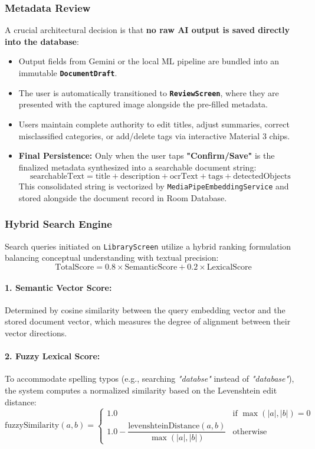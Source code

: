 \subsubsection{Metadata Review}
A crucial architectural decision is that \textbf{no raw AI output is saved directly into the database}:
\begin{itemize}
    \item Output fields from Gemini or the local ML pipeline are bundled into an immutable \textbf{\texttt{DocumentDraft}}.
    \item The user is automatically transitioned to \textbf{\texttt{ReviewScreen}}, where they are presented with the captured image alongside the pre-filled metadata.
    \item Users maintain complete authority to edit titles, adjust summaries, correct misclassified categories, or add/delete tags via interactive Material 3 chips.
    \item \textbf{Final Persistence:} Only when the user taps \textbf{"Confirm/Save"} is the finalized metadata synthesized into a searchable document string:
    $$\text{searchableText} = \text{title} + \text{description} + \text{ocrText} + \text{tags} + \text{detectedObjects}$$
    This consolidated string is vectorized by \texttt{MediaPipeEmbeddingService} and stored alongside the document record in Room Database.
\end{itemize}

\subsubsection{Hybrid Search Engine}
Search queries initiated on \texttt{LibraryScreen} utilize a hybrid ranking formulation balancing conceptual understanding with textual precision:
\begin{equation}
\text{TotalScore} = 0.8 \times \text{SemanticScore} + 0.2 \times \text{LexicalScore}
\end{equation}

\paragraph{1. Semantic Vector Score:}
Determined by cosine similarity between the query embedding vector and the stored document vector, which measures the degree of alignment between their vector directions.

\paragraph{2. Fuzzy Lexical Score:}
To accommodate spelling typos (e.g., searching \textit{"databse"} instead of \textit{"database"}), the system computes a normalized similarity based on the Levenshtein edit distance:
\begin{equation}
\text{fuzzySimilarity}(a, b) = 
\begin{cases}
1.0 & \text{if } \max(|a|, |b|) = 0 \\
1.0 - \dfrac{\text{levenshteinDistance}(a, b)}{\max(|a|, |b|)} & \text{otherwise}
\end{cases}
\end{equation}

